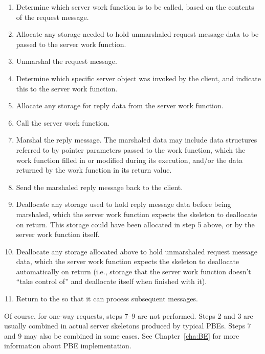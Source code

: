 \begin{enumerate}
  \item Determine which server work function is to be called, based on the
  contents of the request message.

  \item Allocate any storage needed to hold unmarshaled request message data to
  be passed to the server work function.

  \item Unmarshal the request message.

  \item Determine which specific server object was invoked by the client, and
  indicate this to the server work function.

  \item Allocate any storage for reply data from the server work function.

  \item Call the server work function.

  \item Marshal the reply message.  The marshaled data may include data
  structures referred to by pointer parameters passed to the work function,
  which the work function filled in or modified during its execution, and/or
  the data returned by the work function in its return value.

  \item Send the marshaled reply message back to the client.

  \item Deallocate any storage used to hold reply message data before being
  marshaled, which the server work function expects the skeleton to deallocate
  on return.  This storage could have been allocated in step 5 above, or by the
  server work function itself.

  \item Deallocate any storage allocated above to hold unmarshaled request
  message data, which the server work function expects the skeleton to
  deallocate automatically on return (i.e., storage that the server work
  function doesn't ``take control of'' and deallocate itself when finished with
  it).

  \item Return to the \ORB{} so that it can process subsequent messages.
\end{enumerate}

Of course, for one-way \RPC{} requests, steps 7--9 are not performed.  Steps 2
and 3 are usually combined in actual server skeletons produced by typical PBEs.
Steps 7 and 9 may also be combined in some cases.  See Chapter~\ref{cha:BE} for
more information about PBE implementation.

